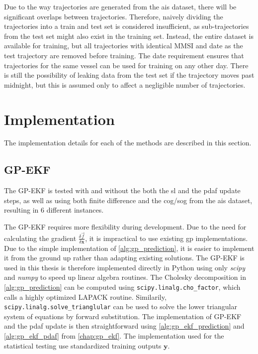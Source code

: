 Due to the way trajectories are generated from the \acrshort{ais} dataset, there will be significant overlaps between trajectories. Therefore, naively dividing the trajectories into a train and test set is considered insufficient, as sub-trajectories from the test set might also exist in the training set. Instead, the entire dataset is available for training, but all trajectories with identical MMSI and date as the test trajectory are removed before training. The date requirement ensures that trajectories for the same vessel can be used for training on any other day. There is still the possibility of leaking data from the test set if the trajectory moves past midnight, but this is assumed only to affect a negligible number of trajectories.


\section{Implementation}
The implementation details for each of the methods are described in this section.

\subsection{GP-EKF}
The GP-EKF is tested with and without the both the \acrshort{sl} and the \acrshort{pdaf} update steps, as well as using both finite difference and the \acrshort{cog}/\acrshort{sog} from the \acrshort{ais} dataset, resulting in $6$ different instances.

The GP-EKF requires more flexibility during development. Due to the need for calculating the gradient $\frac{\delta \vec{f}}{\delta \boldsymbol{x}}$, it is impractical to use existing \acrshort{gp} implementations. Due to the simple implementation of \cref{alg:gp_prediction}, it is easier to implement it from the ground up rather than adapting existing solutions.
The GP-EKF is used in this thesis is therefore implemented directly in Python using only \textit{scipy}\cite{scipy} and \textit{numpy}\cite{numpy} to speed up linear algebra routines. The Cholesky decomposition in \cref{alg:gp_prediction} can be computed using \texttt{scipy.linalg.cho\_factor}, which calls a highly optimized LAPACK routine. Similarily, \texttt{scipy.linalg.solve\_\-trianglular} can be used to solve the lower triangular system of equations by forward substitution. The implementation of GP-EKF and the \acrshort{pdaf} update is then straightforward using \cref{alg:gp_ekf_prediction} and \cref{alg:gp_ekf_pdaf} from \cref{chap:gp_ekf}. The implementation used for the statistical testing use standardized training outputs $\boldsymbol{y}$.

